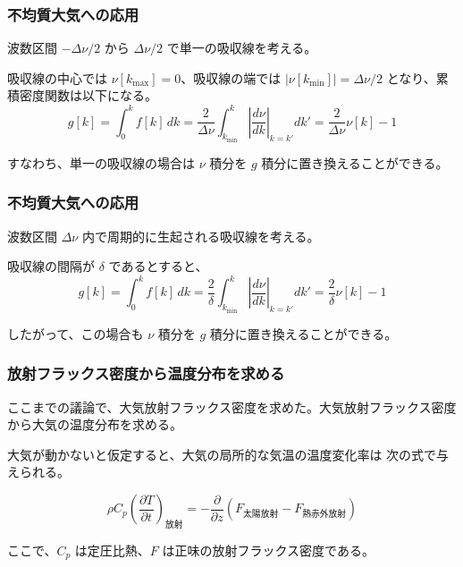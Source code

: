 \documentclass[unicode,colorlinks]{beamer}
\begin{document}
\begin{frame}
	\frametitle{不均質大気への応用}
	波数区間 $-\Delta\nu/2$ から $\Delta\nu/2$ で単一の吸収線を考える。

	吸収線の中心では $\nu[k_{\mathrm{max}}]=0$、吸収線の端では
	$|\nu[k_{\mathrm{min}}]|=\Delta\nu/2$ となり、累積密度関数は以下になる。
	\[
		g[k]=\int^k_0 f[k]\,dk
		=\frac{2}{\Delta\nu}\int^k_{k_{\mathrm{min}}}\left|\frac{d\nu}{dk}\right|_{k=k'}dk'
		=\frac{2}{\Delta\nu}\nu[k]-1
	\]

	すなわち、単一の吸収線の場合は $\nu$ 積分を $g$ 積分に置き換えることができる。
\end{frame}

\begin{frame}
	\frametitle{不均質大気への応用}
	波数区間 $\Delta\nu$ 内で周期的に生起される吸収線を考える。

	吸収線の間隔が $\delta$ であるとすると、
	\[
		g[k]=\int^k_0 f[k]\,dk
		=\frac{2}{\delta}\int^k_{k_{\mathrm{min}}}\left|\frac{d\nu}{dk}\right|_{k=k'}dk'
		=\frac{2}{\delta}\nu[k]-1
	\]

	したがって、この場合も $\nu$ 積分を $g$ 積分に置き換えることができる。
\end{frame}

% 

\begin{frame}
	\frametitle{放射フラックス密度から温度分布を求める}
	ここまでの議論で、大気放射フラックス密度を求めた。大気放射フラックス密度
	から大気の温度分布を求める。

	大気が動かないと仮定すると、大気の局所的な気温の温度変化率は
	次の式で与えられる。

	\[
		\rho C_p\left(\frac{\partial T}{\partial t}\right)_\text{放射}
		=-\frac{\partial}{\partial z}(F_\text{太陽放射}-F_\text{熱赤外放射})
	\]

	ここで、$C_p$ は定圧比熱、$F$ は正味の放射フラックス密度である。
\end{frame}
\end{document}
